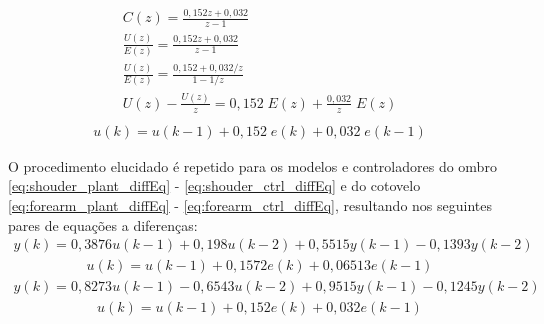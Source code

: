 \begin{equation*}
  \begin{gathered}
    C(z) = \frac{0,152z + 0,032}{z - 1}\\[0.5cm]
    \frac{U(z)}{E(z)} = \frac{0,152z + 0,032}{z - 1}\\[0.5cm]
    \frac{U(z)}{E(z)} = \frac{0,152 + 0,032/z}{1 - 1/z}\\[0.5cm]
    U(z) - \frac{U(z)}{z} = 0,152\;E(z) + \frac{0,032}{z}\;E(z)\\[0.5cm]
  \end{gathered}
  \label{eq:base_ctrl_diffEqIntro}
\end{equation*}
\begin{equation}
  \begin{gathered}
    u(k) = u(k-1) + 0,152\; e(k) + 0,032 \;e(k-1)
  \end{gathered}
  \label{eq:base_ctrl_diffEq}
\end{equation}

O procedimento elucidado é repetido para os modelos e controladores do ombro \eqref{eq:shouder_plant_diffEq} - \eqref{eq:shouder_ctrl_diffEq} 
e do cotovelo \eqref{eq:forearm_plant_diffEq} - \eqref{eq:forearm_ctrl_diffEq}, resultando nos seguintes pares de equações a diferenças:
\begin{equation}
  \begin{gathered}
    y(k) = 0,3876 u(k-1) + 0,198 u(k-2) + 0,5515 y(k-1) - 0,1393 y(k-2)
  \end{gathered}
  \label{eq:shouder_plant_diffEq}
\end{equation}
\begin{equation}
  \begin{gathered}
    u(k) = u(k-1) + 0,1572  e(k) + 0,06513 e(k-1)
  \end{gathered}
  \label{eq:shouder_ctrl_diffEq}
\end{equation}
\begin{equation}
  \begin{gathered}
    y(k) = 0,8273 u(k-1) - 0,6543 u(k-2) + 0,9515y(k-1) - 0,1245y(k-2)
  \end{gathered}
  \label{eq:forearm_plant_diffEq}
\end{equation}
\begin{equation}
  \begin{gathered}
    u(k) = u(k-1) + 0,152 e(k) + 0,032 e(k-1)
  \end{gathered}
  \label{eq:forearm_ctrl_diffEq}
\end{equation}

